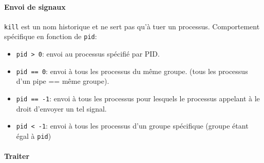 \paragraph{Envoi de signaux}\label{envoi-de-signaux}

\begin{Shaded}
\begin{Highlighting}[]
\PreprocessorTok{ }

\OperatorTok{(}\OperatorTok{,} \OperatorTok{);}
\end{Highlighting}
\end{Shaded}

\texttt{kill} est un nom historique et ne sert pas qu'à tuer un
processus. Comportement spécifique en fonction de \texttt{pid}:

\begin{itemize}
\tightlist
\item
  \texttt{pid\ \textgreater{}\ 0}: envoi au processus spécifié par PID.
\item
  \texttt{pid\ ==\ 0}: envoi à tous les processus du même groupe. (tous
  les processus d'un pipe == même groupe).
\item
  \texttt{pid\ ==\ -1}: envoi à tous les processus pour lesquels le
  processus appelant à le droit d'envoyer un tel signal.
\item
  \texttt{pid\ \textless{}\ -1}: envoi à tous les processus d'un groupe
  spécifique (groupe étant égal à \texttt{\textbar{}pid\textbar{}})
\end{itemize}

\paragraph{Traiter}\label{traiter}

\begin{Shaded}
\begin{Highlighting}[]
\PreprocessorTok{ }
  \OperatorTok{(*}\OperatorTok{)(}\OperatorTok{);}

\OperatorTok{(}\OperatorTok{,}\OperatorTok{);}
\CommentTok{/*}
\CommentTok{*/}
\end{Highlighting}
\end{Shaded}

